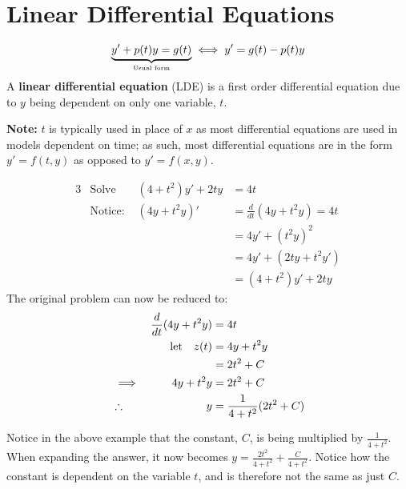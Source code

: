 \documentclass[twoside]{report}
\begin{document}
    \chapter{Linear Differential Equations}
    \begin{definition}
        \begin{equation}
            \underbrace{y' + p(t)y = g(t)}_\text{\tiny Usual form}\iff y' = g(t) - p(t)y
        \end{equation}
        A \textbf{linear differential equation} (LDE) is a first order differential equation due to $y$ being dependent on only one variable, $t$.
    \end{definition}
    \textbf{Note:} $t$ is typically used in place of $x$ as most differential equations are used in models dependent on time; as such, most differential equations are in the form $y' = f(t, y)$ as opposed to $y' = f(x, y)$.
    \begin{example}
        \begin{alignat}{3}
            &\text{Solve } &(4 + t^{2})y' + 2ty &= 4t\\
            &\text{Notice: }&(4y + t^{2}y)' &= \frac{d}{dt}(4y + t^{2}y) = 4t\\
            &&&= 4y' + (t^{2}y)^{2}\\
            &&&= 4y' + (2ty + t^{2}y')\\
            &&&= (4 + t^2)y' + 2ty
        \end{alignat}
        The original problem can now be reduced to:
        \begin{alignat}{3}
            &&\frac{d}{dt}(4y + t^2y)&= 4t\\
            &&\text{let\quad}z(t) &= 4y + t^{2}y\\
            &&&= 2 t^{2} + C\\
            &\implies& 4y + t^{2}y &= 2 t^{2}+C\\
            &\therefore& y &= \frac{1}{4+t^{2}}(2 t^{2}+C)
        \end{alignat}
    \end{example}
    \begin{remark}[Constants]
        Notice in the above example that the constant, $C$, is being multiplied by $\frac{1}{4 + t^{2}}$. When expanding the answer, it now becomes $y = \frac{2t^{2}}{4+t^{2}} + \frac{C}{4+t^{2}}$. Notice how the constant is dependent on the variable $t$, and is therefore not the same as just $C$.
    \end{remark}
\end{document}
